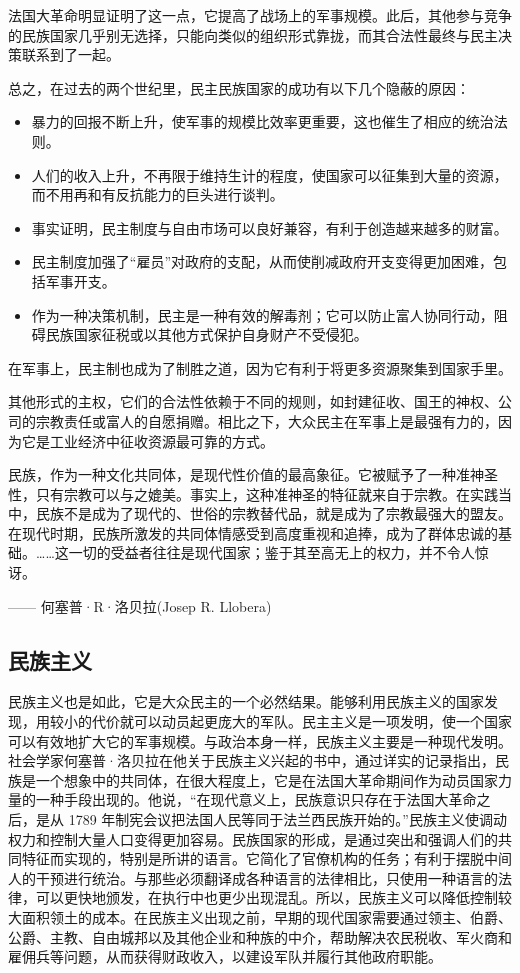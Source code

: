 法国大革命明显证明了这一点，它提高了战场上的军事规模。此后，其他参与竞争的民族国家几乎别无选择，只能向类似的组织形式靠拢，而其合法性最终与民主决策联系到了一起。

总之，在过去的两个世纪里，民主民族国家的成功有以下几个隐蔽的原因：

\begin{itemize}
    \item 暴力的回报不断上升，使军事的规模比效率更重要，这也催生了相应的统治法则。
    \item 人们的收入上升，不再限于维持生计的程度，使国家可以征集到大量的资源，而不用再和有反抗能力的巨头进行谈判。
    \item 事实证明，民主制度与自由市场可以良好兼容，有利于创造越来越多的财富。
    \item 民主制度加强了“雇员”对政府的支配，从而使削减政府开支变得更加困难，包括军事开支。
    \item 作为一种决策机制，民主是一种有效的解毒剂；它可以防止富人协同行动，阻碍民族国家征税或以其他方式保护自身财产不受侵犯。
\end{itemize}

在军事上，民主制也成为了制胜之道，因为它有利于将更多资源聚集到国家手里。

其他形式的主权，它们的合法性依赖于不同的规则，如封建征收、国王的神权、公司的宗教责任或富人的自愿捐赠。相比之下，大众民主在军事上是最强有力的，因为它是工业经济中征收资源最可靠的方式。

\begin{tcolorbox}
民族，作为一种文化共同体，是现代性价值的最高象征。它被赋予了一种准神圣性，只有宗教可以与之媲美。事实上，这种准神圣的特征就来自于宗教。在实践当中，民族不是成为了现代的、世俗的宗教替代品，就是成为了宗教最强大的盟友。在现代时期，民族所激发的共同体情感受到高度重视和追捧，成为了群体忠诚的基础。……这一切的受益者往往是现代国家；鉴于其至高无上的权力，并不令人惊讶。
\begin{flushright}
—— 何塞普·R·洛贝拉(Josep R. Llobera) 
\end{flushright}
\end{tcolorbox}

\subsection{民族主义}
民族主义也是如此，它是大众民主的一个必然结果。能够利用民族主义的国家发现，用较小的代价就可以动员起更庞大的军队。民主主义是一项发明，使一个国家可以有效地扩大它的军事规模。与政治本身一样，民族主义主要是一种现代发明。社会学家何塞普·洛贝拉在他关于民族主义兴起的书中，通过详实的记录指出，民族是一个想象中的共同体，在很大程度上，它是在法国大革命期间作为动员国家力量的一种手段出现的。他说，“在现代意义上，民族意识只存在于法国大革命之后，是从 1789 年制宪会议把法国人民等同于法兰西民族开始的。”民族主义使调动权力和控制大量人口变得更加容易。民族国家的形成，是通过突出和强调人们的共同特征而实现的，特别是所讲的语言。它简化了官僚机构的任务；有利于摆脱中间人的干预进行统治。与那些必须翻译成各种语言的法律相比，只使用一种语言的法律，可以更快地颁发，在执行中也更少出现混乱。所以，民族主义可以降低控制较大面积领土的成本。在民族主义出现之前，早期的现代国家需要通过领主、伯爵、公爵、主教、自由城邦以及其他企业和种族的中介，帮助解决农民税收、军火商和雇佣兵等问题，从而获得财政收入，以建设军队并履行其他政府职能。


